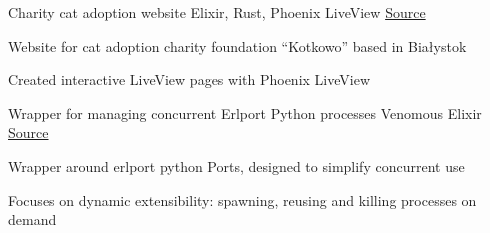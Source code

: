 

\begin{cventries}

  \cventry
    {Charity cat adoption website} %
    {} %
    {Elixir, Rust, Phoenix LiveView} %
    {\href{https://github.com/kotkowo/kotkowo}{\faGithubSquare\acvHeaderIconSep Source}} %
    {
      \begin{cvitems} %
        \item {Website for cat adoption charity foundation ``Kotkowo'' based in Białystok}
        \item {Created interactive LiveView pages with Phoenix LiveView}
      \end{cvitems}
    } %
    \vspace{7mm}
  \cventry
    {Wrapper for managing concurrent Erlport Python processes} %
    {Venomous} %
    {Elixir} %
    {\href{https://github.com/rustysnek/venomous}{\faGithubSquare\acvHeaderIconSep Source}} %
    {
      \begin{cvitems} %
        \item {Wrapper around erlport python Ports, designed to simplify concurrent use}
        \item {Focuses on dynamic extensibility: spawning, reusing and killing processes on demand}
      \end{cvitems}
    } %
    \vspace{5mm}


\end{cventries}
